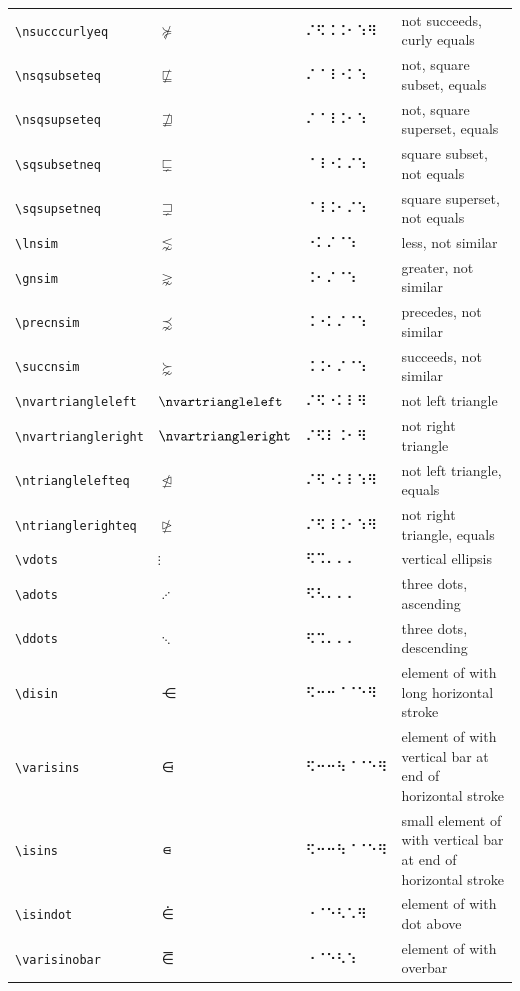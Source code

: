\documentclass[oneside]{article}
\begin{document}
\begin{longtable}{llll}
\verb|\nsucccurlyeq| & $\nsucccurlyeq$ &   ⠌⠫⠨⠨⠂⠱⠻   & {not succeeds, curly equals} \\[2ex]
\verb|\nsqsubseteq| & $\nsqsubseteq$ &   ⠌⠈⠸⠐⠅⠱   & {not, square subset, equals} \\[2ex]
\verb|\nsqsupseteq| & $\nsqsupseteq$ &   ⠌⠈⠸⠨⠂⠱   & {not, square superset, equals} \\[2ex]
\verb|\sqsubsetneq| & $\sqsubsetneq$ &   ⠈⠸⠐⠅⠌⠱   & {square subset, not equals} \\[2ex]
\verb|\sqsupsetneq| & $\sqsupsetneq$ &   ⠈⠸⠨⠂⠌⠱   & {square superset, not equals} \\[2ex]
\verb|\lnsim| & $\lnsim$ &   ⠐⠅⠌⠈⠱   & {less, not similar} \\[2ex]
\verb|\gnsim| & $\gnsim$ &   ⠨⠂⠌⠈⠱   & {greater, not similar} \\[2ex]
\verb|\precnsim| & $\precnsim$ &   ⠨⠐⠅⠌⠈⠱   & {precedes, not similar} \\[2ex]
\verb|\succnsim| & $\succnsim$ &   ⠨⠨⠂⠌⠈⠱   & {succeeds, not similar} \\[2ex]
\verb|\nvartriangleleft| & $\nvartriangleleft$ &   ⠌⠫⠐⠅⠇⠻   & {not left triangle} \\[2ex]
\verb|\nvartriangleright| & $\nvartriangleright$ &   ⠌⠫⠇⠨⠂⠻   & {not right triangle} \\[2ex]
\verb|\ntrianglelefteq| & $\ntrianglelefteq$ &   ⠌⠫⠐⠅⠇⠱⠻   & {not left triangle, equals} \\[2ex]
\verb|\ntrianglerighteq| & $\ntrianglerighteq$ &   ⠌⠫⠸⠨⠂⠱⠻   & {not right triangle, equals} \\[2ex]
\verb|\vdots| & $\vdots$ &   ⠫⠩⠄⠄⠄   & {vertical ellipsis} \\[2ex]
\verb|\adots| & $\adots$ &   ⠫⠣⠄⠄⠄   & {three dots, ascending} \\[2ex]
\verb|\ddots| & $\ddots$ &   ⠫⠩⠄⠄⠄   & {three dots, descending} \\[2ex]
\verb|\disin| & $\disin$ &   ⠫⠒⠒⠈⠈⠑⠻   & {element of with long horizontal stroke} \\[2ex]
\verb|\varisins| & $\varisins$ &   ⠫⠒⠒⠳⠈⠈⠑⠻   & {element of with vertical bar at end of horizontal stroke} \\[2ex]
\verb|\isins| & $\isins$ &   ⠫⠒⠒⠳⠈⠈⠑⠻   & {small element of with vertical bar at end of horizontal stroke} \\[2ex]
\verb|\isindot| & $\isindot$ &   ⠐⠈⠑⠣⠡⠻   & {element of with dot above} \\[2ex]
\verb|\varisinobar| & $\varisinobar$ &   ⠐⠈⠑⠣⠱   & {element of with overbar} \\[2ex]

\end{longtable}
\end{document}
